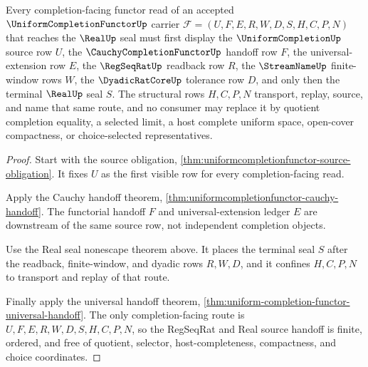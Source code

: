 \begin{theorem}
\label{thm:uniformcompletionfunctor-regseqrat-real-source-handoff}
Every completion-facing functor read of an accepted $\UniformCompletionFunctorUp$ carrier $\mathcal{F}=(U,F,E,R,W,D,S,H,C,P,N)$ that reaches the $\RealUp$ seal must first display the $\UniformCompletionUp$ source row $U$, the $\CauchyCompletionFunctorUp$ handoff row $F$, the universal-extension row $E$, the $\RegSeqRatUp$ readback row $R$, the $\StreamNameUp$ finite-window rows $W$, the $\DyadicRatCoreUp$ tolerance row $D$, and only then the terminal $\RealUp$ seal $S$. The structural rows $H,C,P,N$ transport, replay, source, and name that same route, and no consumer may replace it by quotient completion equality, a selected limit, a host complete uniform space, open-cover compactness, or choice-selected representatives.
\end{theorem}
\begin{proof}
Start with the source obligation, \autoref{thm:uniformcompletionfunctor-source-obligation}. It fixes $U$ as the first visible row for every completion-facing read.

Apply the Cauchy handoff theorem, \autoref{thm:uniformcompletionfunctor-cauchy-handoff}. The functorial handoff $F$ and universal-extension ledger $E$ are downstream of the same source row, not independent completion objects.

Use the Real seal nonescape theorem above. It places the terminal seal $S$ after the readback, finite-window, and dyadic rows $R,W,D$, and it confines $H,C,P,N$ to transport and replay of that route.

Finally apply the universal handoff theorem, \autoref{thm:uniform-completion-functor-universal-handoff}. The only completion-facing route is $U,F,E,R,W,D,S,H,C,P,N$, so the RegSeqRat and Real source handoff is finite, ordered, and free of quotient, selector, host-completeness, compactness, and choice coordinates.
\end{proof}


